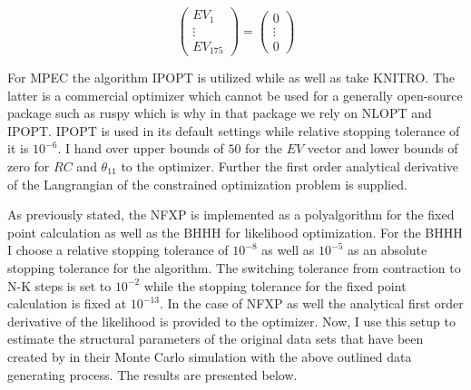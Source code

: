 \begin{equation*}
	\begin{pmatrix} EV_1 \\ \vdots \\ EV_{175} \end{pmatrix} = \begin{pmatrix} 0 \\ \vdots \\ 0 \end{pmatrix}
\end{equation*}

For MPEC the algorithm IPOPT is utilized while \citeauthor{Iskhakov.2016} as well as \citeauthor{Su.Judd.2012} take KNITRO. The latter is a commercial optimizer which cannot be used for a generally open-source package such as ruspy which is why in that package we rely on NLOPT and IPOPT. IPOPT is used in its default settings while relative stopping tolerance of it is $10^{-6}$. I hand over upper bounds of $50$ for the $EV$ vector and lower bounds of zero for $RC$ and $\theta_{11}$ to the optimizer. Further the first order analytical derivative of the Langrangian of the constrained optimization problem is supplied.

As previously stated, the NFXP is implemented as a polyalgorithm for the fixed point calculation as well as the BHHH for likelihood optimization. For the BHHH I choose a relative stopping tolerance of $10^{-8}$ as well as $10^{-5}$ as an absolute stopping tolerance for the algorithm. The switching tolerance from contraction to N-K steps is set to $10^{-2}$ while the stopping tolerance for the fixed point calculation is fixed at $10^{-13}$. In the case of NFXP as well the analytical first order derivative of the likelihood is provided to the optimizer. Now, I use this setup to estimate the structural parameters of the original data sets that have been created by \citeauthor{Iskhakov.2016} in their Monte Carlo simulation with the above outlined data generating process. The results are presented below.\paragraph{}

